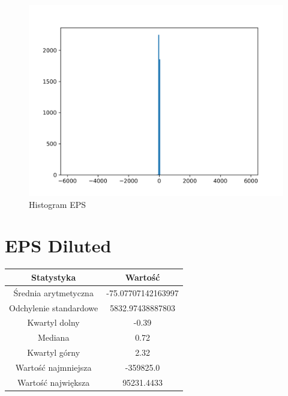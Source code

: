 \documentclass{article}
\begin{document}
\begin{figure}[h!]
    \includegraphics[width=\linewidth]{variables/EPS.png}
    \caption{Histogram EPS }
\end{figure}\section{ EPS Diluted }

\begin{center}
    \begin{tabular}{|c | c|} 
    \hline
    Statystyka & Wartość \\
    \hline\hline
    Średnia arytmetyczna & -75.07707142163997 \\ 
    \hline
    Odchylenie standardowe & 5832.97438887803 \\
    \hline
    Kwartyl dolny & -0.39 \\
    \hline
    Mediana & 0.72 \\
    \hline
    Kwartyl górny & 2.32 \\
    \hline
    Wartość najmniejsza & -359825.0 \\
    \hline
    Wartość największa & 95231.4433 \\
    \hline
   \end{tabular}
\end{center}
\end{document}
